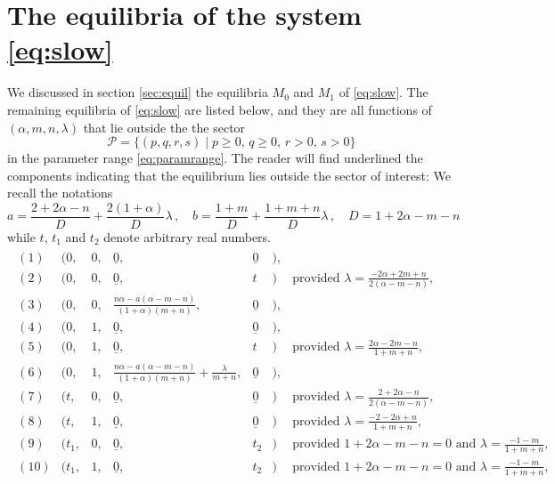 \documentclass[usletter,11pt]{article}
\theoremstyle{remark}
\begin{document}
\section{The equilibria of the system \eqref{eq:slow} }\label{append:equi_reject}
We discussed in section \ref{sec:equil} the equilibria $M_0$ and $M_1$ of \eqref{eq:slow}. 
The remaining equilibria of \eqref{eq:slow} are listed below, and they are  all functions of $(\alpha,m,n,\lambda)$ that 
lie outside the the sector 
$$
\mathcal{P} = \{(p,q,r,s) \; | \; p\ge0, \,  q\ge0, \,  r>0, \, s>0 \}
$$ 
in the parameter range \eqref{eq:paramrange}.
The reader will find underlined  the components indicating that the equilibrium lies outside the sector of interest:
We recall  the notations
$$
a=\frac{2+2\alpha-n}{D} + \frac{2(1 + \alpha)}{D}\lambda \, , \quad 
b=\frac{1+m}{D} + \frac{1+m+n}{D}\lambda \, , \quad
D=1+2\alpha-m-n
$$ 
while  $t$, $t_1$ and $t_2$ denote arbitrary real numbers. 
\allowdisplaybreaks
\begin{align*}
 \begin{array}{lllllll}
  (1) &\Big(0,&0,& \underline{0},&\underline{0}&\Big), \\%
  (2) &\Big(0,&0,& \underline{0},&t&            \Big) &\text{provided } \lambda = \frac{-2\alpha+2m+n}{2(\alpha-m-n)},\\
  (3) &\Big(0,&0,& \frac{n\alpha - a(\alpha-m-n)}{(1+\alpha)(m+n)}, &\underline{0}&\Big),\\
  (4) &\Big(0,&1,& \underline{0},&\underline{0}&\Big), \\
  (5) &\Big(0,&1,& \underline{0},&t&           \Big) &\text{provided } \lambda = \frac{2\alpha-2m-n}{1+m+n},\\
  (6) &\Big(0,&1,& \frac{n\alpha - a(\alpha-m-n)}{(1+\alpha)(m+n)}+\frac{\lambda}{m+n}, &\underline{0}&\Big),\\
  (7) &\Big(t,&0,& \underline{0},&\underline{0}&\Big) &\text{provided } \lambda=\frac{2+2\alpha-n}{2(\alpha-m-n)}, \\
  (8) &\Big(t,&1,& \underline{0},&\underline{0}&\Big) &\text{provided } \lambda=\frac{-2-2\alpha+n}{1+m+n}, \\
  (9) &\Big(t_1,&0,& \underline{0},&t_2&           \Big) &\text{provided $1+2\alpha-m-n=0$ and $\lambda=\frac{-1-m}{1+m+n}$}, \\
 (10) &\Big(t_1,&1,& \underline{0},&t_2&           \Big) &\text{provided $1+2\alpha-m-n=0$ and $\lambda=\frac{-1-m}{1+m+n}$}, \\
 \end{array}
\end{align*}
\end{document}

